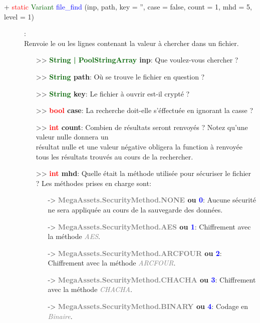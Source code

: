 \documentclass[a4paper, 11pt]{article}
\begin{document}
	\begin{description}
		\item [+ \textcolor{red}{static} \textcolor{darkgreen}{Variant} \textcolor{blue}{file\_find} (inp, 
		path, key = '', case = false, count = 1, mhd = 5, level = 1)]: \\Renvoie le ou les lignes contenant 
		la valeur à chercher dans un fichier.
		\begin{itemize}
			\item [>> \textbf{\textcolor{darkgreen}{String | PoolStringArray} inp}:] Que voulez-vous 
			chercher ?
			\item [>> \textbf{\textcolor{darkgreen}{String} path}:] Où se trouve le fichier en question ?
			\item [>> \textbf{\textcolor{darkgreen}{String} key}:] Le fichier à ouvrir est-il crypté ?
			\item [>> \textbf{\textcolor{red}{bool} case}:] La recherche doit-elle s'éffectuée en ignorant 
			la casse ?
			\item [>> \textbf{\textcolor{red}{int} count}:] Combien de résultats seront renvoyés ? Notez 
			qu'une valeur nulle donnera un \\résultat nulle et une valeur négative obligera la function à 
			renvoyée tous les résultats trouvés au cours de la rechercher.
			\item [>> \textbf{\textcolor{red}{int} mhd}:] Quelle était la méthode utilisée pour sécuriser 
			le fichier ? Les méthodes prises en charge sont:
			\begin{itemize}
				\item [-> \textbf{\textcolor{gray}{MegaAssets.SecurityMethod.NONE} ou \textcolor{blue}{0}}:] 
				Aucune sécurité ne sera appliquée au cours de la sauvegarde des données.
				\item [-> \textbf{\textcolor{gray}{MegaAssets.SecurityMethod.AES} ou \textcolor{blue}{1}}:] 
				Chiffrement avec la méthode \textit{\textcolor{gray}{AES}}.
				\item [-> \textbf{\textcolor{gray}{MegaAssets.SecurityMethod.ARCFOUR} ou \textcolor{blue}
				{2}}:] Chiffrement avec la méthode \textit{\textcolor{gray}{ARCFOUR}}.
				\item [-> \textbf{\textcolor{gray}{MegaAssets.SecurityMethod.CHACHA} ou \textcolor{blue}
				{3}}:] Chiffrement avec la méthode \textit{\textcolor{gray}{CHACHA}}.
				\item [-> \textbf{\textcolor{gray}{MegaAssets.SecurityMethod.BINARY} ou \textcolor{blue}
				{4}}:] Codage en \textit{\textcolor{gray}{Binaire}}.

\end{itemize}
\end{itemize}
\end{description}
\end{document}
